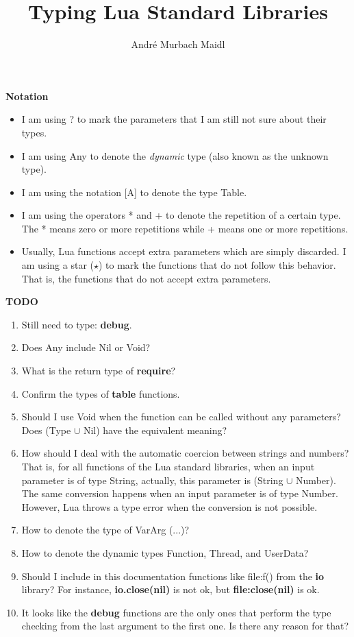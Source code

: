 \documentclass[12pt]{article}
\title{Typing Lua Standard Libraries}
\author{André Murbach Maidl}
\begin{document}
\maketitle

\textbf{Notation}

\begin{itemize}
\item I am using ? to mark the parameters that I am still not
sure about their types.
\item I am using Any to denote the \textit{dynamic} type
(also known as the unknown type).
\item I am using the notation [A] to denote the type Table.
\item I am using the operators * and + to denote the repetition
of a certain type. The * means zero or more repetitions while +
means one or more repetitions.
\item Usually, Lua functions accept extra parameters which are
simply discarded.
I am using a star ($\star$) to mark the functions that do not
follow this behavior.
That is, the functions that do not accept extra parameters.
\end{itemize}

\newpage

\textbf{TODO}

\begin{enumerate}
\item Still need to type: \textbf{debug}.
\item Does Any include Nil or Void?
\item What is the return type of \textbf{require}?
\item Confirm the types of \textbf{table} functions.
\item Should I use Void when the function can be called without any
parameters? Does (Type $\cup$ Nil) have the equivalent meaning?
\item How should I deal with the automatic coercion between
strings and numbers?
That is, for all functions of the Lua standard libraries,
when an input parameter is of type String, actually, this
parameter is (String $\cup$ Number).
The same conversion happens when an input parameter is of type
Number.
However, Lua throws a type error when the conversion is not
possible.
\item How to denote the type of VarArg (...)?
\item How to denote the dynamic types Function, Thread, and UserData?
\item Should I include in this documentation functions like
file:f() from the \textbf{io} library?
For instance, \textbf{io.close(nil)} is not ok, but
\textbf{file:close(nil)} is ok.
\item It looks like the \textbf{debug} functions are the only ones
that perform the type checking from the last argument to the first
one.
Is there any reason for that?
\end{enumerate}
\end{document}
